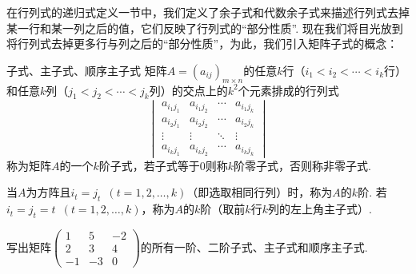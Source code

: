 在行列式的递归式定义一节中，我们定义了余子式和代数余子式来描述行列式去掉某一行和某一列之后的值，它们反映了行列式的``部分性质''. 现在我们将目光放到将行列式去掉更多行与列之后的``部分性质''，为此，我们引入矩阵子式的概念：

\begin{definition}{}{子式、主子式、顺序主子式}
    矩阵$A=(a_{ij})_{m \times n}$的任意$k$行（$i_1<i_2<\cdots<i_k$行）和任意$k$列（$j_1<j_2<\cdots<j_k$列）的交点上的$k^2$个元素排成的行列式
    \[\begin{vmatrix}
            a_{i_1j_1} & a_{i_1j_2} & \cdots & a_{i_1j_k} \\
            a_{i_2j_1} & a_{i_2j_2} & \cdots & a_{i_2j_k} \\
            \vdots     & \vdots     & \ddots & \vdots     \\
            a_{i_kj_1} & a_{i_kj_2} & \cdots & a_{i_kj_k}
        \end{vmatrix}\]
    称为矩阵$A$的一个$k$阶子式，若子式等于0则称$k$阶零子式，否则称非零子式.

    当$A$为方阵且$i_t=j_t\enspace(t=1,2,\ldots,k)$（即选取相同行列）时，称为$A$的$k$阶. 若$i_t=j_t=t\enspace(t=1,2,\ldots,k)$，称为$A$的$k$阶（取前$k$行$k$列的左上角主子式）.
\end{definition}

\begin{example}{}{}
    写出矩阵$\begin{pmatrix}
            1 & 5 & -2 \\ 2 & 3 & 4 \\ -1 & -3 & 0
        \end{pmatrix}$的所有一阶、二阶子式、主子式和顺序主子式.
\end{example}

